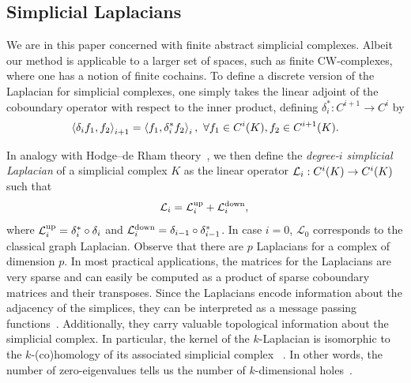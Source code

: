 \subsection{Simplicial Laplacians}
We are in this paper concerned with finite abstract simplicial complexes. Albeit our method is applicable to a larger set of spaces, such as finite CW-complexes, where one has a notion of finite cochains. 
To define a discrete version of the Laplacian for simplicial complexes, one simply takes the linear adjoint of the coboundary operator with respect to the inner product, defining $\delta_i^\ast:C^{i+1}\to C^i$ by
\begin{equation*}
  \left\langle \delta_i f_1 , f_2 \right\rangle_{i+1} =\left\langle f_1 , \delta_i^\ast f_2 \right\rangle_{i},\ \forall f_1\in C^{i}(K), f_2 \in C^{i+1}(K).
\end{equation*}

In analogy with Hodge--de Rham theory~\cite{madsen1997calculus}, we then define the \emph{degree-$i$ simplicial Laplacian} of a simplicial complex $K$ as the linear operator $\mathcal{L}_i:C^i(K)\to C^i(K)$ such that
\begin{equation*}
  \mathcal{L}_i = \mathcal{L}^{\text{up}}_i + \mathcal{L}^{\text{down}}_i,\\
\end{equation*}
where $\mathcal{L}^{\text{up}}_i =  \delta_{i}^\ast\circ\delta_{i}$ and $\mathcal{L}^{\text{down}}_i = \delta_{i-1}\circ\delta_{i-1}^\ast$. In case $i=0$, $\mathcal{L}_0$ corresponds to the classical graph Laplacian. Observe that there are $p$ Laplacians for a complex of dimension $p$. In most practical applications, the matrices for the Laplacians are very sparse and can easily be computed as a product of sparse coboundary matrices and their transposes. Since the Laplacians encode information about the adjacency of the simplices, they can be interpreted as a message passing functions~\cite{gilmer2017NeuralMP}. Additionally, they carry valuable topological information about the simplicial complex. In particular, the kernel of the $k$-Laplacian is isomorphic to the $k$-(co)homology of its associated simplicial complex ~\cite{eckmann1944}. In other words, the number of zero-eigenvalues tells us the number of $k$-dimensional holes~\cite{horak2013spectra}.
